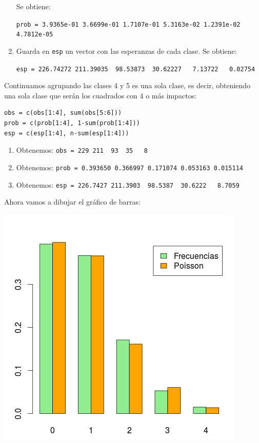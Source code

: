 \documentclass[palatino,nochap]{apuntes}
\begin{document}
\begin{example}
\begin{enumerate}
Se obtiene:

\verb|prob = 3.9365e-01 3.6699e-01 1.7107e-01 5.3163e-02 1.2391e-02 4.7812e-05|

\item Guarda en \verb|esp| un vector con las esperanzas de cada clase. Se obtiene:

\verb|esp = 226.74272 211.39035  98.53873  30.62227   7.13722   0.02754|
\end{enumerate}

Continuamos agrupando las clases 4 y 5 es una sola clase, es decir, obteniendo una sola clase que serán los cuadrados con 4 o más impactos:

\begin{verbatim}
obs = c(obs[1:4], sum(obs[5:6]))
prob = c(prob[1:4], 1-sum(prob[1:4]))
esp = c(esp[1:4], n-sum(esp[1:4]))
\end{verbatim}

\begin{enumerate}
\item Obtenemos: \verb|obs = 229 211  93  35   8|
\item Obtenemos: \verb|prob = 0.393650 0.366997 0.171074 0.053163 0.015114|
\item Obtenemos: \verb|esp = 226.7427 211.3903  98.5387  30.6222   8.7059|
\end{enumerate}

Ahora vamos a dibujar el gráfico de barras:

\includegraphics[scale=0.5]{img/contrasteba.png}


\end{example}
\end{document}
